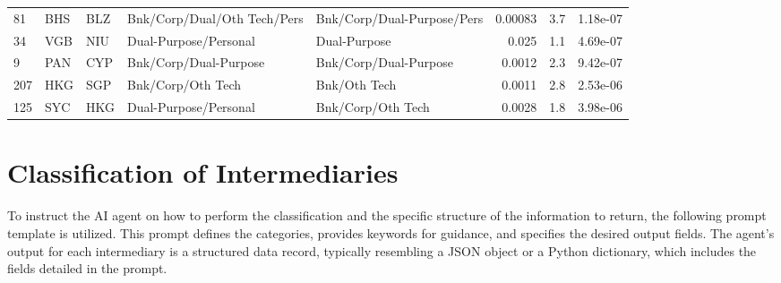{\begin{longtable}{@{}lllp{3cm}p{3cm}rrr@{}}
81  & BHS & BLZ & Bnk/Corp/Dual/Oth Tech/Pers & Bnk/Corp/Dual-Purpose/Pers  & 0.00083  & 3.7       & 1.18e-07  \\
34  & VGB & NIU & Dual-Purpose/Personal       & Dual-Purpose                & 0.025    & 1.1       & 4.69e-07  \\
9   & PAN & CYP & Bnk/Corp/Dual-Purpose       & Bnk/Corp/Dual-Purpose       & 0.0012   & 2.3       & 9.42e-07  \\
207 & HKG & SGP & Bnk/Corp/Oth Tech           & Bnk/Oth Tech                & 0.0011   & 2.8       & 2.53e-06  \\
125 & SYC & HKG & Dual-Purpose/Personal       & Bnk/Corp/Oth Tech           & 0.0028   & 1.8       & 3.98e-06  \\
\end{longtable}
} %
\clearpage

\section{Classification of Intermediaries}
\label{sec:appendix_intermediary_classification}

To instruct the AI agent on how to perform the classification and the specific structure of the information to return, the following prompt template is utilized. This prompt defines the categories, provides keywords for guidance, and specifies the desired output fields. The agent's output for each intermediary is a structured data record, typically resembling a JSON object or a Python dictionary, which includes the fields detailed in the prompt.

